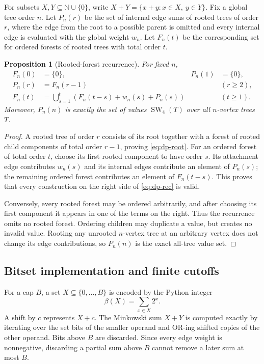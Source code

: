 \documentclass[11pt]{article}
\newtheorem{proposition}[theorem]{Proposition}
\theoremstyle{definition}
\theoremstyle{remark}
\newcommand{\SW}{\operatorname{SW}_4}
\newcommand{\N}{\mathbb N}
\begin{document}
For subsets $X,Y\subseteq\N\cup\{0\}$, write
$X+Y=\{x+y:x\in X,\ y\in Y\}$.
Fix a global tree order $n$.  Let $P_n(r)$ be the set of internal edge sums of
rooted trees of order $r$, where the edge from the root to a possible parent is
omitted and every internal edge is evaluated with the global weight $w_n$.
Let $F_n(t)$ be the corresponding set for ordered forests of rooted trees with
total order $t$.

\begin{proposition}[Rooted-forest recurrence]\label{prop:rooted-dp}
For fixed $n$,
\begin{align}
  F_n(0)&=\{0\}, & P_n(1)&=\{0\},\label{eq:dp-base}\\
  P_n(r)&=F_n(r-1) &&(r\ge2),\label{eq:dp-root}\\
  F_n(t)&=\bigcup_{s=1}^{t}
  \left(F_n(t-s)+w_n(s)+P_n(s)\right) &&(t\ge1).
  \label{eq:dp-rec}
\end{align}
Moreover, $P_n(n)$ is exactly the set of values $\SW(T)$ over all
$n$-vertex trees $T$.
\end{proposition}

\begin{proof}
A rooted tree of order $r$ consists of its root together with a forest of
rooted child components of total order $r-1$, proving \eqref{eq:dp-root}.
For an ordered forest of total order $t$, choose its first rooted component to
have order $s$.  Its attachment edge contributes $w_n(s)$ and its internal
edges contribute an element of $P_n(s)$; the remaining ordered forest
contributes an element of $F_n(t-s)$.  This proves that every construction on
the right side of \eqref{eq:dp-rec} is valid.

Conversely, every rooted forest may be ordered arbitrarily, and after choosing
its first component it appears in one of the terms on the right.  Thus the
recurrence omits no rooted forest.  Ordering children may duplicate a value,
but creates no invalid value.  Rooting any unrooted $n$-vertex tree at an
arbitrary vertex does not change its edge contributions, so $P_n(n)$ is the
exact all-tree value set.
\end{proof}

\subsection{Bitset implementation and finite cutoffs}

For a cap $B$, a set $X\subseteq\{0,\ldots,B\}$ is encoded by the Python
integer
\[
  \beta(X)=\sum_{x\in X}2^x.
\]
A shift by $c$ represents $X+c$.  The Minkowski sum $X+Y$ is computed exactly
by iterating over the set bits of the smaller operand and OR-ing shifted copies
of the other operand.  Bits above $B$ are discarded.  Since every edge weight
is nonnegative, discarding a partial sum above $B$ cannot remove a later sum at
most $B$.
\end{document}
